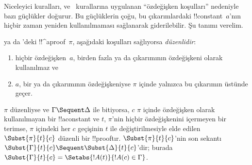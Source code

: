 



Niceleyici kuralları, \LeftR{\lexists} ve~\RightR{\lforall} kurallarına
uygulanan ``özdeğişken koşulları'' nedeniyle bazı güçlükler doğurur. Bu
güçlüklerin çoğu, bu çıkarımlardaki !!{constant}~$a$'nın hiçbir zaman
yeniden kullanılmaması sağlanarak giderilebilir. Şu tanımı verelim.

\begin{defn}
 ya da 'deki !!^a{proof}~$\pi$, aşağıdaki koşulları
sağlıyorsa \emph{düzenlidir}:
\begin{enumerate}
  \item hiçbir özdeğişken~$a$, birden fazla \LeftR{\lexists} ya da
  \RightR{\lforall} çıkarımının özdeğişkeni olarak kullanılmaz ve
  \item $a$, bir \LeftR{\lexists} ya da \RightR{\lforall} çıkarımının
  özdeğişkeniyse $\pi$ içinde yalnızca bu çıkarımın üstünde geçer.
\end{enumerate}
\end{defn}

\begin{lem} $\pi$ düzenliyse ve $\Gamma \Sequent
\Delta$ ile bitiyorsa, $c$ $\pi$ içinde özdeğişken olarak kullanılmayan
bir !!a{constant} ve $t$, $\pi$'nin hiçbir özdeğişkenini içermeyen bir
terimse, $\pi$ içindeki her $c$ geçişinin $t$ ile değiştirilmesiyle elde
edilen $\Subst{\pi}{t}{c}$ düzenli bir !!{proof}{}tır. $\Subst{\pi}{t}{c}$'nin
son sekantı $\Subst{\Gamma}{t}{c} \Sequent \Subst{\Delta}{t}{c}$'dir;
burada $\Subst{\Gamma}{t}{c} = \Setabs{!A(t)}{!A(c) \in \Gamma}$.
\end{lem}

